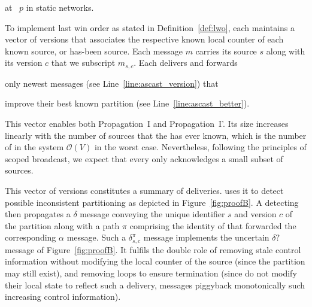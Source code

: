 \begin{algorithm}
  
  \caption{\label{algo:ascast}\NAME at \Process~$p$ in static networks.}
\end{algorithm}

To implement last win order as stated in Definition~\ref{def:lwo},
each \process maintains a vector of versions that associates the
respective known local counter of each known source, or has-been
source. Each message $m$ carries its source $s$ along with its version
$c$ that we subscript $m_{s, c}$.  Each \process delivers and forwards
\begin{inparaenum}[(i)]
\item only newest messages (see Line~\ref{line:ascast_version}) that
\item improve their best known partition (see
  Line~\ref{line:ascast_better}).
\end{inparaenum}
This vector enables both Propagation~I and Propagation~I'.  Its size
increases linearly with the number of sources that the \process has
ever known, which is the number of \processes in the system
$\mathcal{O}(V)$ in the worst case.
Nevertheless, following the principles of scoped broadcast, we expect
that every \process only acknowledges a small subset of sources.

This vector of versions constitutes a summary of deliveries. \NAME
uses it to detect possible inconsistent partitioning as depicted in
Figure~\ref{fig:proofB}. A detecting \process then propagates a
$\delta$ message conveying the unique identifier $s$ and version $c$
of the partition along with a path $\pi$ comprising the identity of
\processes that forwarded the corresponding $\alpha$ message. Such a
$\delta_{s, c}^{\pi}$ message implements the uncertain $\delta?$
message of Figure~\ref{fig:proofB}. It fulfils the double role of
removing stale control information without modifying the local counter
of the source (since the partition may still exist), and removing
loops to ensure termination (since \processes do not modify their
local state to reflect such a delivery, messages piggyback
monotonically such increasing control information).

